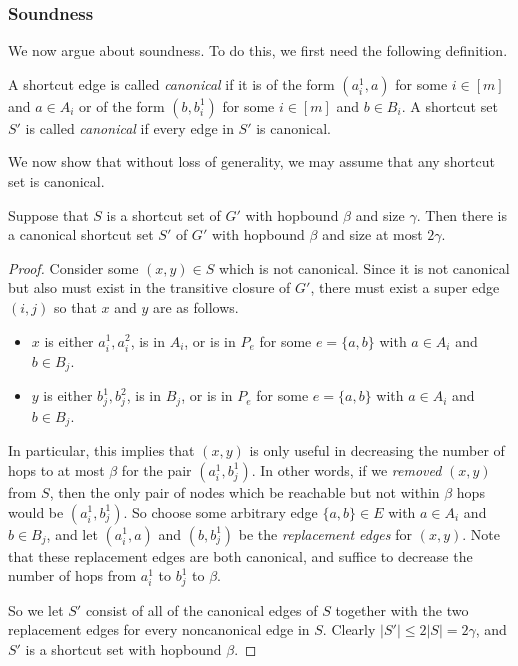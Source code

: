 \subsubsection{Soundness}
We now argue about soundness.  To do this, we first need the following definition.

\begin{definition} \label{def:canonical}
    A shortcut edge is called \emph{canonical} if it is of the form $(a_i^1, a)$ for some $i \in [m]$ and $a \in A_i$ or of the form $(b, b_i^1)$ for some $i \in [m]$ and $b \in B_i$.  A shortcut set $S'$ is called \emph{canonical} if every edge in $S'$ is canonical. 
\end{definition}

We now show that without loss of generality, we may assume that any shortcut set is canonical.

\begin{lemma} \label{lem:canonical}
    Suppose that $S$ is a shortcut set of $G'$ with hopbound $\beta$ and size $\gamma$.  Then there is a canonical shortcut set $S'$ of $G'$ with hopbound $\beta$ and size at most $2 \gamma$.
\end{lemma}
\begin{proof}
    Consider some $(x,y) \in S$ which is not canonical.  Since it is not canonical but also must exist in the transitive closure of $G'$, there must exist a super edge $(i,j)$ so that $x$ and $y$ are as follows.
    \begin{itemize}
        \item $x$ is either $a_i^1, a_i^2$, is in $A_i$, or is in $P_e$ for some $e = \{a,b\}$ with $a \in A_i$ and $b \in B_j$.
        \item $y$ is either $b_j^1, b_j^2$, is in $B_j$, or is in $P_e$ for some $e = \{a,b\}$ with $a \in A_i$ and $b \in B_j$.
    \end{itemize}
    In particular, this implies that $(x,y)$ is only useful in decreasing the number of hops to at most $\beta$ for the pair $(a_i^1, b_j^1)$.  In other words, if we \emph{removed} $(x,y)$ from $S$, then the only pair of nodes which be reachable but not within $\beta$ hops would be $(a_i^1, b_j^1)$.  So choose some arbitrary edge $\{a,b\} \in E$ with $a \in A_i$ and $b \in B_j$, and let $(a_i^1, a)$ and $(b, b_j^1)$ be the \emph{replacement edges} for $(x,y)$.  Note that these replacement edges are both canonical, and suffice to decrease the number of hops from $a_i^1$ to $b_j^1$ to $\beta$.

    So we let $S'$ consist of all of the canonical edges of $S$ together with the two replacement edges for every noncanonical edge in $S$.  Clearly $|S'| \leq 2|S| =2\gamma$, and $S'$ is a shortcut set with hopbound $\beta$.  
\end{proof}

